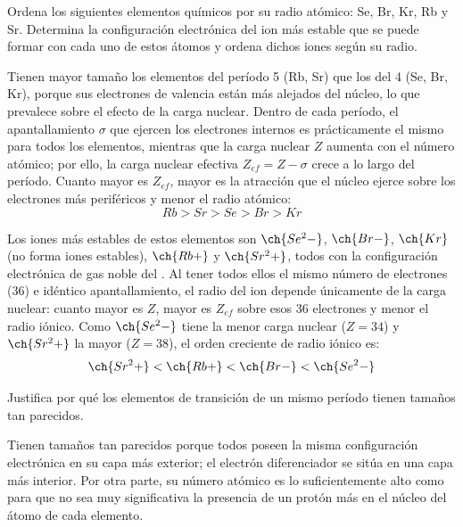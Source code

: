 \begin{question}
    Ordena los siguientes elementos químicos por su radio
    atómico: Se, Br, Kr, Rb y Sr. Determina la configuración
    electrónica del ion más estable que se puede formar
    con cada uno de estos átomos y ordena dichos iones
    según su radio.


    \begin{solu}


        Tienen mayor tamaño los elementos del período 5 (Rb, Sr) que los
        del 4 (Se, Br, Kr), porque sus electrones de valencia están más
        alejados del núcleo, lo que prevalece sobre el efecto de la
        carga nuclear. Dentro de cada período, el apantallamiento
        \(\sigma\) que ejercen los electrones internos es prácticamente
        el mismo para todos los elementos, mientras que la carga
        nuclear \(Z\) aumenta con el número atómico; por ello, la carga
        nuclear efectiva \(Z_{ef} = Z - \sigma\) crece a lo largo del
        período. Cuanto mayor es \(Z_{ef}\), mayor es la atracción que
        el núcleo ejerce sobre los electrones más periféricos y menor
        el radio atómico:
        \[Rb > Sr > Se > Br > Kr\]

        Los iones más estables de estos elementos son \(\ch{Se^2-}\),
        \(\ch{Br-}\), \(\ch{Kr}\) (no forma iones estables), \(\ch{Rb+}\)
        y \(\ch{Sr^2+}\), todos con la configuración electrónica de gas
        noble del . Al tener todos ellos el mismo número de
        electrones (36) e idéntico apantallamiento, el radio del ion
        depende únicamente de la carga nuclear: cuanto mayor es \(Z\),
        mayor es \(Z_{ef}\) sobre esos 36 electrones y menor el radio
        iónico. Como \(\ch{Se^2-}\) tiene la menor carga nuclear
        (\(Z=34\)) y \(\ch{Sr^2+}\) la mayor (\(Z=38\)), el orden
        creciente de radio iónico es:
        \[\ch{Sr^2+} < \ch{Rb+} < \ch{Br-} < \ch{Se^2-}\]
    \end{solu}
\end{question}

\begin{question}
    Justifica por qué los elementos de transición de un mismo
    período tienen tamaños tan parecidos.


    \begin{solu}
        Tienen tamaños tan parecidos porque todos poseen la misma
        configuración electrónica en su capa más exterior; el electrón
        diferenciador se sitúa en una capa más interior. Por otra
        parte, su número atómico es lo suficientemente alto como
        para que no sea muy significativa la presencia de un protón
        más en el núcleo del átomo de cada elemento.
    \end{solu}

\end{question}

